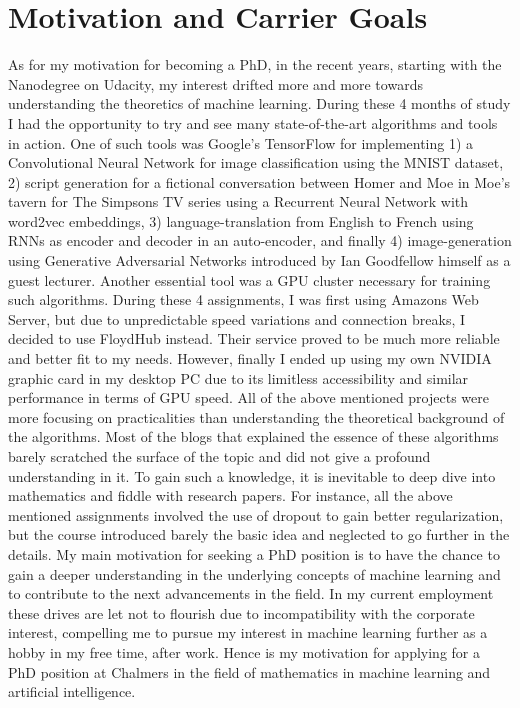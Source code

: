 \documentclass[12pt]{article}
\begin{document}
\section*{Motivation and Carrier Goals}
\label{sec:motivation}
As for my motivation for becoming a PhD, in the recent years, starting with the Nanodegree on Udacity, my interest drifted more and more towards understanding the theoretics of machine learning. During these 4 months of study I had the opportunity to try and see many state-of-the-art algorithms and tools in action. One of such tools was Google's TensorFlow for implementing 1) a Convolutional Neural Network for image classification using the MNIST dataset, 2) script generation for a fictional conversation between Homer and Moe in Moe's tavern for The Simpsons TV series using a Recurrent Neural Network with word2vec embeddings, 3) language-translation from English to French using RNNs as encoder and decoder in an auto-encoder, and finally 4) image-generation using Generative Adversarial Networks introduced by Ian Goodfellow himself as a guest lecturer.
Another essential tool was a GPU cluster necessary for training such algorithms. During these 4 assignments, I was first using Amazons Web Server, but due to unpredictable speed variations and connection breaks, I decided to use FloydHub instead. Their service proved to be much more reliable and better fit to my needs. However, finally I ended up using my own NVIDIA graphic card in my desktop PC due to its limitless accessibility and similar performance in terms of GPU speed.
All of the above mentioned projects were more focusing on practicalities than understanding the theoretical background of the algorithms. Most of the blogs that explained the essence of these algorithms barely scratched the surface of the topic and did not give a profound understanding in it. To gain such a knowledge, it is inevitable to deep dive into mathematics and fiddle with research papers. For instance, all the above mentioned assignments involved the use of dropout to gain better regularization, but the course introduced barely the basic idea and neglected to go further in the details. My main motivation for seeking a PhD position is to have the chance to gain a deeper understanding in the underlying concepts of machine learning and to contribute to the next advancements in the field. In my current employment these drives are let not to flourish due to incompatibility with the corporate interest, compelling me to pursue my interest in machine learning further as a hobby in my free time, after work. Hence is my motivation for applying for a PhD position at Chalmers in the field of mathematics in machine learning and artificial intelligence.
\end{document}
